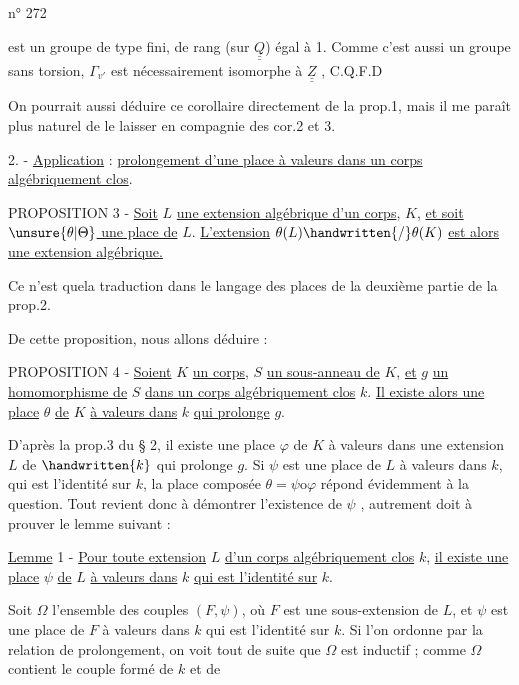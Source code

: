 \hfill n° 272

est un groupe de type fini, de rang (sur $\underline{\underline Q}$) égal à 1. Comme c'est aussi un groupe sans torsion, $\Gamma_{v'}$ est nécessairement isomorphe à $\underline{\underline Z}$ , C.Q.F.D

\handwritten{[}On pourrait aussi déduire ce corollaire directement de la prop.1, mais il me paraît plus naturel de le laisser en compagnie des cor.2 et 3\handwritten{]}.

2. - \uline{Application} : \uline{prolongement d'une place à valeurs dans un corps algébriquement clos}.

PROPOSITION 3 - \uline{Soit} $L$ \uline{une extension algébrique d'un corps}, $K$, \uline{et soit $\unsure{\theta|\Theta}$ une place de} $L$. \uline{L'extension} $\theta(L)\handwritten{/}\theta(K)$ \uline{est alors une extension algébrique.}

Ce n'est que\handwritten{\,}la traduction dans le langage des places de la deuxième partie de la prop.2.

De cette proposition, nous allons déduire :

PROPOSITION 4 - \uline{Soient} $K$ \uline{un corps}, $S$ \uline{un sous-anneau de} $K$, \uline{et} $g$ \uline{un homomorphisme de} $S$ \uline{dans un corps algébriquement clos} $k$. \uline{Il existe alors une place} $\theta$ \uline{de} $K$ \uline{à valeurs dans} $k$ \uline{qui prolonge} $g$.

D'après la prop.3 du § 2, il existe une place $\varphi$ de $K$ à valeurs dans une extension $L$ de $\handwritten{k}$ qui prolonge $g$. Si $\psi$ est une place de $L$ à valeurs dans $k$, qui est l'identité sur $k$, la place composée $\theta=\psi\mathbin{\mathrm{o}}\varphi$ répond évidemment à la question. Tout revient donc à démontrer l'existence de $\psi$ , autrement doit à prouver le lemme suivant :

\uline{Lemme} 1 - \uline{Pour toute extension} $L$ \uline{d'un corps algébriquement clos} $k$, \uline{il existe une place} $\psi$ \uline{de} $L$ \uline{à valeurs dans} $k$ \uline{qui est l'identité sur} $k$.

Soit $\Omega$ l'ensemble des couples $(F,\psi)$, où $F$ est une sous-extension de $L$, et $\psi$ est une place de $F$ à valeurs dans $k$ qui est l'identité sur $k$. Si l'on ordonne \handwritten{\inserted{$\Omega$}} par la relation de prolongement, on voit tout de suite que $\Omega$ est inductif ; comme $\Omega$ contient le couple formé de $k$ et de

